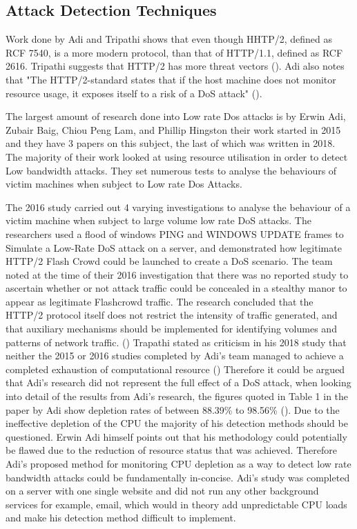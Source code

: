 \subsection{Attack Detection Techniques}
Work done by Adi and Tripathi shows that even though HHTP/2, defined as RCF 7540, is a more  modern protocol, than that of HTTP/1.1, defined as  RCF 2616. Tripathi suggests that HTTP/2 has more threat vectors (\cite{tripathi2018slow}). Adi also notes that "The HTTP/2-standard states that if the host machine does not monitor resource usage, it exposes itself to a risk of a DoS attack" (\cite{Adi2015}).

The largest amount of research done into Low rate Dos attacks is by Erwin Adi, Zubair Baig, Chiou Peng Lam, and Phillip Hingston their work started in 2015 and they have 3 papers on this subject, the last of which was written in 2018. The majority of their work looked at using resource utilisation in order to detect Low bandwidth attacks. They set numerous tests to analyse the behaviours of victim machines when subject to Low rate Dos Attacks. 

The 2016 study carried out 4 varying investigations to analyse the behaviour of a victim machine when subject to large volume low rate DoS attacks. The researchers used a flood of windows PING and WINDOWS UPDATE frames to Simulate a Low-Rate DoS attack on a server, and demonstrated how legitimate HTTP/2 Flash Crowd could be launched to create a DoS scenario.  The team noted at the time of their 2016 investigation that there was no reported study to ascertain whether or not attack traffic could be concealed in a stealthy manor to appear as legitimate Flashcrowd traffic. The research concluded that the HTTP/2 protocol itself does not restrict the intensity of traffic generated, and that auxiliary mechanisms should be implemented for identifying volumes and patterns of network traffic. (\cite{Adi2016}) Trapathi stated as criticism in his 2018 study that neither the 2015 or 2016 studies completed by Adi's team managed to achieve a completed exhaustion of computational resource (\cite{tripathi2018slow}) Therefore it could be argued that Adi's research did not represent the full effect of a DoS attack, when looking into detail of the results from Adi's research, the figures quoted in Table 1 in the paper by Adi show depletion rates of between 88.39\% to 98.56\% (\cite{Adi2016}). Due to the ineffective depletion of the CPU the majority of his detection methods should be questioned. Erwin Adi himself points out that his methodology could potentially be flawed due to the reduction of resource status that was achieved. Therefore Adi's proposed method for monitoring CPU depletion as a way to detect low rate bandwidth attacks could be fundamentally in-concise. Adi's study was completed on a server with one single website and did not run any other background services for example, email, which would in theory add unpredictable CPU loads and make his detection method difficult to implement.
